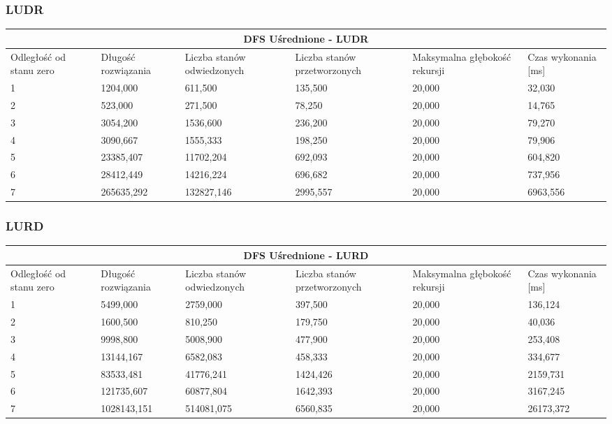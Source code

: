 \documentclass{classrep}
\begin{document}
{\subsubsection{LUDR}
\begin{center}
	\begin{tabular}{ | p{1.6cm} | p{2cm} | p{2cm} | p{2cm} | p{2.2cm} | p{2cm} | }
	\hline
	\multicolumn{6}{|c|}{DFS Uśrednione - LUDR} \\
	\hline
	Odległość od stanu zero & Długość rozwiązania & Liczba stanów odwiedzonych & Liczba stanów przetworzonych & Maksymalna głębokość rekursji & Czas wykonania [ms]\\
	\hline
	1 &1204,000&611,500&135,500&20,000&32,030\\
	\hline
	2&523,000&271,500&78,250&20,000&14,765\\
	\hline
	3 &3054,200&1536,600&236,200&20,000&79,270\\
	\hline
	4 &3090,667&1555,333&198,250&20,000&79,906\\
	\hline
	5 &23385,407&11702,204&692,093&20,000&604,820\\
	\hline
	6 &28412,449&14216,224&696,682&20,000&737,956\\
	\hline
	7 &265635,292&132827,146&2995,557&20,000&6963,556 \\
	\hline
	\end{tabular}
\end{center}

\subsubsection{LURD}
\begin{center}
	\begin{tabular}{ | p{1.6cm} | p{2cm} | p{2cm} | p{2cm} | p{2.2cm} | p{2cm} | }
	\hline
	\multicolumn{6}{|c|}{DFS Uśrednione - LURD} \\
	\hline
	Odległość od stanu zero & Długość rozwiązania & Liczba stanów odwiedzonych & Liczba stanów przetworzonych & Maksymalna głębokość rekursji & Czas wykonania [ms]\\
	\hline
	1 &5499,000&2759,000&397,500&20,000&136,124\\
	\hline
	2 &1600,500&810,250&179,750&20,000&40,036\\
	\hline
	3 &9998,800&5008,900&477,900&20,000&253,408\\
	\hline
	4 &13144,167&6582,083&458,333&20,000&334,677\\
	\hline
	5&83533,481&41776,241&1424,426&20,000&2159,731\\
	\hline
	6 &121735,607&60877,804&1642,393&20,000&3167,245\\
	\hline
	7 &1028143,151&514081,075&6560,835&20,000&26173,372\\
	\hline
	\end{tabular}
\end{center}

}
\end{document}
